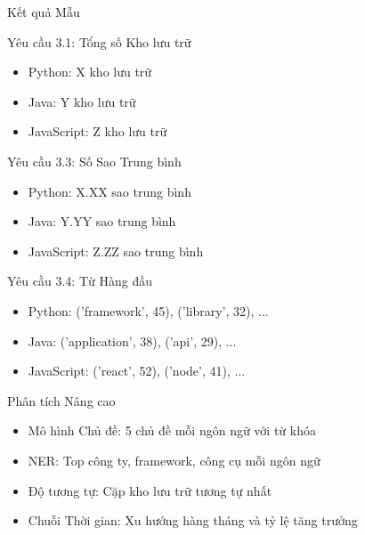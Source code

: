 \documentclass[aspectratio=169]{beamer}
\begin{document}
\begin{frame}{Kết quả Mẫu}
    \begin{block}{Yêu cầu 3.1: Tổng số Kho lưu trữ}
        \begin{itemize}
            \item Python: X kho lưu trữ
            \item Java: Y kho lưu trữ
            \item JavaScript: Z kho lưu trữ
        \end{itemize}
    \end{block}
    
    \begin{block}{Yêu cầu 3.3: Số Sao Trung bình}
        \begin{itemize}
            \item Python: X.XX sao trung bình
            \item Java: Y.YY sao trung bình
            \item JavaScript: Z.ZZ sao trung bình
        \end{itemize}
    \end{block}
    
    \begin{block}{Yêu cầu 3.4: Từ Hàng đầu}
        \begin{itemize}
            \item Python: ('framework', 45), ('library', 32), ...
            \item Java: ('application', 38), ('api', 29), ...
            \item JavaScript: ('react', 52), ('node', 41), ...
        \end{itemize}
    \end{block}
    
    \begin{block}{Phân tích Nâng cao}
        \begin{itemize}
            \item Mô hình Chủ đề: 5 chủ đề mỗi ngôn ngữ với từ khóa
            \item NER: Top công ty, framework, công cụ mỗi ngôn ngữ
            \item Độ tương tự: Cặp kho lưu trữ tương tự nhất
            \item Chuỗi Thời gian: Xu hướng hàng tháng và tỷ lệ tăng trưởng
        \end{itemize}
    \end{block}
\end{frame}
\end{document}
